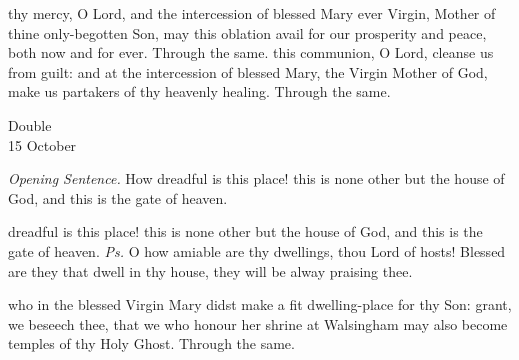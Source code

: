 \secret
{} thy mercy, O Lord, and the intercession of blessed Mary ever Virgin, Mother of thine only-begotten Son, may this oblation avail for our prosperity and peace, both now and for ever. Through the same.
\postcommunion
{} this communion, O Lord, cleanse us from guilt: and at the intercession of blessed Mary, the Virgin Mother of God, make us partakers of thy heavenly healing. Through the same.


\begin{inhead}
	{Double\\
		15 October}
\end{inhead}
\par\noindent
\textit{Opening Sentence.} How dreadful is this place! this is none other but the house of God, and this is the gate of heaven.%
\par\noindent
{}
\par\noindent
{}
\par\noindent
{}

\introit
{} dreadful is this place! this is none other but the house of God, and this is the gate of heaven. \textit{Ps.} O how amiable are thy dwellings, thou Lord of hosts! Blessed are they that dwell in thy house, they will be alway praising thee.

\collect
{} who in the blessed Virgin Mary didst make a fit dwelling-place for thy Son: grant, we beseech thee, that we who honour her shrine at Walsingham may also become temples of thy Holy Ghost. Through the same.

